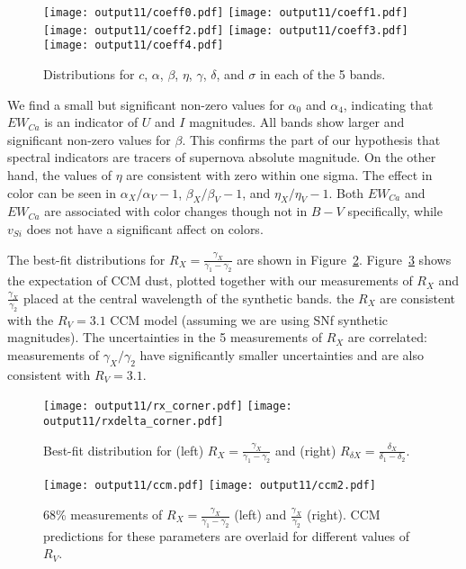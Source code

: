 \documentclass[11pt, oneside]{article}   	%
\begin{document}
\begin{figure}[htbp] %
   \centering
   \texttt{[image: output11/coeff0.pdf]} 
   \texttt{[image: output11/coeff1.pdf]} 
   \texttt{[image: output11/coeff2.pdf]} 
      \texttt{[image: output11/coeff3.pdf]} 
         \texttt{[image: output11/coeff4.pdf]} 
            \caption{Distributions for $c$, $\alpha$, $\beta$, $\eta$, $\gamma$, $\delta$, and $\sigma$ in each of the 5 bands.   \label{global:fig}}

\end{figure}

We find a small but significant non-zero values for $\alpha_0$ and $\alpha_4$, indicating that $EW_{Ca}$ is an indicator of $U$ and $I$
magnitudes.  All bands show larger and significant non-zero values for $\beta$.  This confirms the part of our hypothesis that spectral indicators
are tracers of supernova absolute magnitude.  On the other hand, the values of $\eta$ are consistent with zero within one sigma.
The effect in color can be seen in $\alpha_X/\alpha_V-1$,  $\beta_X/\beta_V-1$, and  $\eta_X/\eta_V-1$.
Both $EW_{Ca}$ and $EW_{Ca}$ are associated with color changes though not in $B-V$ specifically, while
$v_{Si}$ does not have a significant affect on colors.

The best-fit distributions for $R_X=\frac{\gamma_X}{\gamma_1-\gamma_2}$ are shown in Figure~\ref{rx:fig}.  Figure~\ref{ccm:fig}
shows the expectation of CCM dust, plotted together with our measurements of
$R_X$ and $\frac{\gamma_X}{\gamma_2}$ placed at the central wavelength of the synthetic bands.
the $R_X$ are consistent with the  $R_V=3.1$ CCM model (assuming we are using
SNf synthetic magnitudes).  The uncertainties in the 5 measurements
of $R_X$ are correlated: measurements of $\gamma_X/\gamma_2$ have significantly smaller
uncertainties and are also consistent with $R_V=3.1$.

\begin{figure}[htbp] %
   \centering
   \texttt{[image: output11/rx\_corner.pdf]}
      \texttt{[image: output11/rxdelta\_corner.pdf]} 
   \caption{Best-fit distribution for (left)  $R_X=\frac{\gamma_X}{\gamma_1-\gamma_2}$ and (right)  $R_{\delta X}=\frac{\delta_X}{\delta_1-\delta_2}$.
   \label{rx:fig}}
\end{figure}

\begin{figure}[htbp] %
   \centering
   \texttt{[image: output11/ccm.pdf]}
      \texttt{[image: output11/ccm2.pdf]} 
   \caption{68\% measurements of $R_X=\frac{\gamma_X}{\gamma_1-\gamma_2}$ (left) and $\frac{\gamma_X}{\gamma_2}$ (right).  CCM
   predictions for these parameters are overlaid for different values of $R_V$.
   \label{ccm:fig}}
\end{figure}
\end{document}
